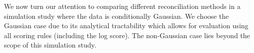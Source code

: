\documentclass[a4paper, 11pt]{article}
\def\E{\text{E}}
\theoremstyle{definition}
\begin{document}
%
%
%
%
%
%


We now turn our attention to comparing different reconciliation methods in a simulation study where the data is conditionally Gaussian. We choose the Gaussian case due to its analytical tractability which allows for evaluation using all scoring rules (including the log score). The non-Gaussian case lies beyond the scope of this simulation study.
\end{document}
